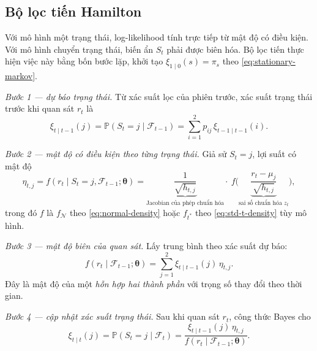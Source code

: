 \documentclass[12pt,a4paper]{article}
\numberwithin{equation}{section}
\theoremstyle{definition}
\newcommand{\Prob}{\mathbb{P}}
\newcommand{\Info}{\mathcal{F}}
\newcommand{\Param}{\symbf{\theta}}
\begin{document}
\subsection{Bộ lọc tiến Hamilton}\label{subsec:filter}
Với mô hình một trạng thái, log-likelihood tính trực tiếp từ mật độ có điều kiện. Với mô
hình chuyển trạng thái, biến ẩn $S_t$ phải được biên hóa. Bộ lọc tiến \cite{hamilton1989}
thực hiện việc này bằng bốn bước lặp, khởi tạo $\xi_{1\mid 0}(s)=\pi_s$ theo
\eqref{eq:stationary-markov}.

\emph{Bước 1 --- dự báo trạng thái.} Từ xác suất lọc của phiên trước, xác suất trạng thái
trước khi quan sát $r_t$ là
\begin{equation}
  \xi_{t\mid t-1}(j)=\Prob\!\left(S_t=j\mid\Info_{t-1}\right)
  =\sum_{i=1}^{2}p_{ij}\,\xi_{t-1\mid t-1}(i).
  \label{eq:predicted-state-prob}
\end{equation}

\emph{Bước 2 --- mật độ có điều kiện theo từng trạng thái.} Giả sử $S_t=j$, lợi suất có
mật độ
\begin{equation}
  \eta_{t,j}=f\!\left(r_t\mid S_t=j,\Info_{t-1};\Param\right)
  =\underbrace{\frac{1}{\sqrt{h_{t,j}}}}_{\text{Jacobian của phép chuẩn hóa}}
  \cdot\ f\!\Bigg(\underbrace{\frac{r_t-\mu_j}{\sqrt{h_{t,j}}}}_{\text{sai số chuẩn hóa }z_t}\Bigg),
  \label{eq:state-density}
\end{equation}
trong đó $f$ là $f_{\mathcal{N}}$ theo \eqref{eq:normal-density} hoặc $f_{t^{*}}$ theo
\eqref{eq:std-t-density} tùy mô hình.

\emph{Bước 3 --- mật độ biên của quan sát.} Lấy trung bình theo xác suất dự báo:
\begin{equation}
  f\!\left(r_t\mid\Info_{t-1};\Param\right)
  =\sum_{j=1}^{2}\xi_{t\mid t-1}(j)\,\eta_{t,j}.
  \label{eq:mixture-density}
\end{equation}
Đây là mật độ của một \emph{hỗn hợp hai thành phần} với trọng số thay đổi theo thời gian.

\emph{Bước 4 --- cập nhật xác suất trạng thái.} Sau khi quan sát $r_t$, công thức Bayes
cho
\begin{equation}
  \xi_{t\mid t}(j)=\Prob\!\left(S_t=j\mid\Info_t\right)
  =\frac{\xi_{t\mid t-1}(j)\,\eta_{t,j}}{f\!\left(r_t\mid\Info_{t-1};\Param\right)}.
  \label{eq:filtered-state-prob}
\end{equation}
\end{document}
